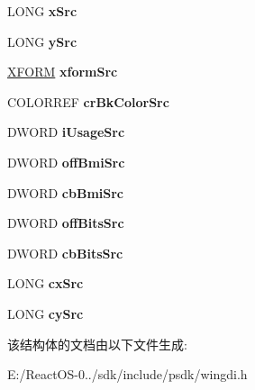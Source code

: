 \begin{DoxyCompactItemize}
L\+O\+NG {\bfseries x\+Src}
\item 
\mbox{\label{structtag_e_m_r_s_t_r_e_t_c_h_b_l_t_abf91cb5d682ab6efb9fbba806d70a9ae}} 
L\+O\+NG {\bfseries y\+Src}
\item 
\mbox{\label{structtag_e_m_r_s_t_r_e_t_c_h_b_l_t_a3489ebc3e8403d83973498decb72a7f9}} 
\hyperlink{struct___x_f_o_r_m}{X\+F\+O\+RM} {\bfseries xform\+Src}
\item 
\mbox{\label{structtag_e_m_r_s_t_r_e_t_c_h_b_l_t_afaea9ca52fe6b35848005c189fd7f035}} 
C\+O\+L\+O\+R\+R\+EF {\bfseries cr\+Bk\+Color\+Src}
\item 
\mbox{\label{structtag_e_m_r_s_t_r_e_t_c_h_b_l_t_a67d8bac59de11df8f4ba10afb6bb613c}} 
D\+W\+O\+RD {\bfseries i\+Usage\+Src}
\item 
\mbox{\label{structtag_e_m_r_s_t_r_e_t_c_h_b_l_t_ab75faffbd4db629c165d69a45187b220}} 
D\+W\+O\+RD {\bfseries off\+Bmi\+Src}
\item 
\mbox{\label{structtag_e_m_r_s_t_r_e_t_c_h_b_l_t_a4abb14bcfcfc0bf6afb3d1e2b0f52f3d}} 
D\+W\+O\+RD {\bfseries cb\+Bmi\+Src}
\item 
\mbox{\label{structtag_e_m_r_s_t_r_e_t_c_h_b_l_t_a686c30a10695125dff2e4537f03f152a}} 
D\+W\+O\+RD {\bfseries off\+Bits\+Src}
\item 
\mbox{\label{structtag_e_m_r_s_t_r_e_t_c_h_b_l_t_a8fc9e4b6009998b073da6755143128e7}} 
D\+W\+O\+RD {\bfseries cb\+Bits\+Src}
\item 
\mbox{\label{structtag_e_m_r_s_t_r_e_t_c_h_b_l_t_a118ec9e5bd069561bbf0cea7484b761c}} 
L\+O\+NG {\bfseries cx\+Src}
\item 
\mbox{\label{structtag_e_m_r_s_t_r_e_t_c_h_b_l_t_aa5e7709172e06900154fbf561198f445}} 
L\+O\+NG {\bfseries cy\+Src}
\end{DoxyCompactItemize}


该结构体的文档由以下文件生成\+:\begin{DoxyCompactItemize}
\item 
E\+:/\+React\+O\+S-\/0../sdk/include/psdk/wingdi.\+h\end{DoxyCompactItemize}
